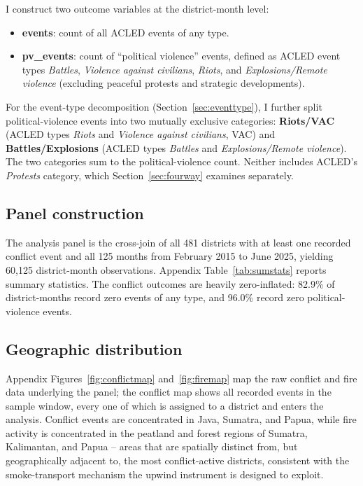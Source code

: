 \documentclass[12pt]{article}
\begin{document}
I construct two outcome variables at the district-month level:
\begin{itemize}
    \item \textbf{events}: count of all ACLED events of any type.
    \item \textbf{pv\_events}: count of ``political violence'' events, defined as ACLED event types \emph{Battles}, \emph{Violence against civilians}, \emph{Riots}, and \emph{Explosions/Remote violence} (excluding peaceful protests and strategic developments).
\end{itemize}

For the event-type decomposition (Section~\ref{sec:eventtype}), I further split political-violence events into two mutually exclusive categories: \textbf{Riots/VAC} (ACLED types \emph{Riots} and \emph{Violence against civilians}, VAC) and \textbf{Battles/Explosions} (ACLED types \emph{Battles} and \emph{Explosions/Remote violence}). The two categories sum to the political-violence count. Neither includes ACLED's \emph{Protests} category, which Section~\ref{sec:fourway} examines separately.

\subsection{Panel construction}

The analysis panel is the cross-join of all 481 districts with at least one recorded conflict event and all 125 months from February 2015 to June 2025, yielding 60{,}125 district-month observations. Appendix Table~\ref{tab:sumstats} reports summary statistics. The conflict outcomes are heavily zero-inflated: 82.9\% of district-months record zero events of any type, and 96.0\% record zero political-violence events.

\subsection{Geographic distribution}

Appendix Figures~\ref{fig:conflictmap} and~\ref{fig:firemap} map the raw conflict and fire data underlying the panel; the conflict map shows all recorded events in the sample window, every one of which is assigned to a district and enters the analysis. Conflict events are concentrated in Java, Sumatra, and Papua, while fire activity is concentrated in the peatland and forest regions of Sumatra, Kalimantan, and Papua -- areas that are spatially distinct from, but geographically adjacent to, the most conflict-active districts, consistent with the smoke-transport mechanism the upwind instrument is designed to exploit.
\end{document}
